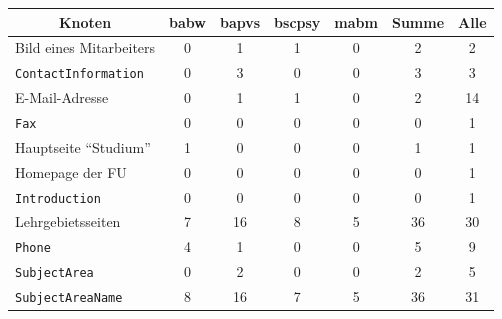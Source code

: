     \begin{table}[htb]
        \centering
        \begin{tabular}{|l|c|c|c|c|c|c|}
            \hline
            \multicolumn{1}{|c|}{\textbf{Knoten}} & \textbf{\gls{babw}} & \textbf{\gls{bapvs}} & \textbf{\gls{bscpsy}} & \textbf{\gls{mabm}} & \textbf{Summe} & \textbf{Alle} \\ \hline
            Bild eines Mitarbeiters                                  & 0             & 1              & 1               & 0             & 2              & 2             \\ \hline
            \texttt{ContactInformation}                    & 0             & 3              & 0               & 0             & 3              & 3             \\ \hline
            E-Mail-Adresse                        & 0             & 1              & 1               & 0             & 2              & 14            \\ \hline
            \texttt{Fax}                                   & 0             & 0              & 0               & 0             & 0              & 1             \\ \hline
            Hauptseite "`Studium"'                & 1             & 0              & 0               & 0             & 1              & 1             \\ \hline
            Homepage der FU                       & 0             & 0              & 0               & 0             & 0              & 1             \\ \hline
            \texttt{Introduction}                          & 0             & 0              & 0               & 0             & 0              & 1             \\ \hline
            Lehrgebietsseiten                     & 7             & 16             & 8               & 5             & 36             & 30            \\ \hline
            \texttt{Phone}                                 & 4             & 1              & 0               & 0             & 5              & 9             \\ \hline
            \texttt{SubjectArea}                           & 0             & 2              & 0               & 0             & 2              & 5             \\ \hline
            \texttt{SubjectAreaName}                       & 8             & 16             & 7               & 5             & 36             & 31            \\ \hline

\end{tabular}
\end{table}
